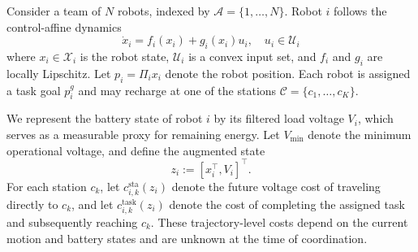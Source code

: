 Consider a team of $N$ robots, indexed by $\mathcal{A}=\{1, \ldots, N\}$.
Robot $i$ follows the control-affine dynamics
\begin{equation}
    \dot{x}_i = f_i(x_i) + g_i (x_i)u_i, \quad u_i \in\mathcal{U}_i
    \label{eq:motion_dynamics}
\end{equation}
where $x_i \in \mathcal{X}_i$ is the robot state, $\mathcal{U}_i$ is a convex input set, and $f_i$ and $g_i$ are locally Lipschitz.
Let $p_i=\Pi_i x_i$ denote the robot position.
Each robot is assigned a task goal $p_i^g$ and may recharge at one of the stations $\mathcal{C}=\{c_1, \ldots, c_K\}$.

We represent the battery state of robot $i$ by its filtered load voltage $V_i$, which serves as a measurable proxy for remaining energy.
Let $V_{\min}$ denote the minimum operational voltage, and define the augmented state
\begin{equation}
    z_i := [x_i^\top, V_i]^\top.
    \label{eq:augmented_state}
\end{equation}
For each station $c_k$, let $c_{i,k}^{\mathrm{sta}}(z_i)$ denote the future voltage cost of traveling directly to $c_k$, and let $c_{i,k}^{\mathrm{task}}(z_i)$ denote the cost of completing the assigned task and subsequently reaching $c_k$.
These trajectory-level costs depend on the current motion and battery states and are unknown at the time of coordination.